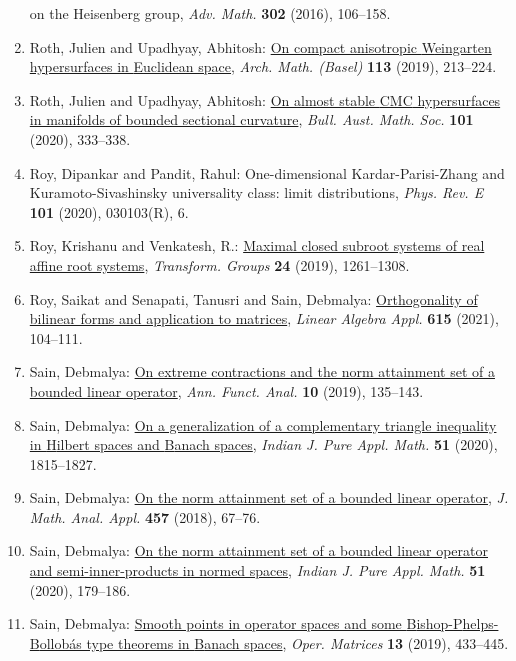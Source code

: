 \begin{enumerate}
{on the {H}eisenberg group}, \emph{Adv. Math.} {\bf 302} (2016), 106--158.
\item Roth, Julien and Upadhyay, Abhitosh: \href{https://doi.org/10.1007/s00013-019-01315-8}{On compact anisotropic {W}eingarten hypersurfaces in
{E}uclidean space}, \emph{Arch. Math. (Basel)} {\bf 113} (2019), 213--224.
\item Roth, Julien and Upadhyay, Abhitosh: \href{https://doi.org/10.1017/s0004972719000935}{On almost stable {CMC} hypersurfaces in manifolds of bounded
sectional curvature}, \emph{Bull. Aust. Math. Soc.} {\bf 101} (2020), 333--338.
\item Roy, Dipankar and Pandit, Rahul: One-dimensional {K}ardar-{P}arisi-{Z}hang and
{K}uramoto-{S}ivashinsky universality class: limit
distributions, \emph{Phys. Rev. E} {\bf 101} (2020), 030103(R), 6.
\item Roy, Krishanu and Venkatesh, R.: \href{https://doi.org/10.1007/s00031-018-9510-9}{Maximal closed subroot systems of real affine root systems}, \emph{Transform. Groups} {\bf 24} (2019), 1261--1308.
\item Roy, Saikat and Senapati, Tanusri and Sain, Debmalya: \href{https://doi.org/10.1016/j.laa.2020.12.032}{Orthogonality of bilinear forms and application to matrices}, \emph{Linear Algebra Appl.} {\bf 615} (2021), 104--111.
\item Sain, Debmalya: \href{https://doi.org/10.1215/20088752-2018-0014}{On extreme contractions and the norm attainment set of a
bounded linear operator}, \emph{Ann. Funct. Anal.} {\bf 10} (2019), 135--143.
\item Sain, Debmalya: \href{https://doi.org/10.1007/s13226-020-0498-1}{On a generalization of a complementary triangle inequality in
{H}ilbert spaces and {B}anach spaces}, \emph{Indian J. Pure Appl. Math.} {\bf 51} (2020), 1815--1827.
\item Sain, Debmalya: \href{https://doi.org/10.1016/j.jmaa.2017.07.070}{On the norm attainment set of a bounded linear operator}, \emph{J. Math. Anal. Appl.} {\bf 457} (2018), 67--76.
\item Sain, Debmalya: \href{https://doi.org/10.1007/s13226-020-0393-9}{On the norm attainment set of a bounded linear operator and
semi-inner-products in normed spaces}, \emph{Indian J. Pure Appl. Math.} {\bf 51} (2020), 179--186.
\item Sain, Debmalya: \href{https://doi.org/10.7153/oam-2019-13-32}{Smooth points in operator spaces and some
{B}ishop-{P}helps-{B}ollob\'{a}s type theorems in {B}anach spaces}, \emph{Oper. Matrices} {\bf 13} (2019), 433--445.

\end{enumerate}
